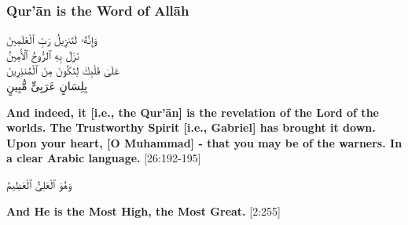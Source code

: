 \subsubsection*{Qur'\=an is the Word of All\=ah}
\begin{center}
    \begin{RLtext}
        وَإِنَّهُۥ لَتَنزِيلُ رَبِّ ٱلْعَٰلَمِينَ \\
        نَزَلَ بِهِ ٱلرُّوحُ ٱلْأَمِينُ \\
        عَلَىٰ قَلْبِكَ لِتَكُونَ مِنَ ٱلْمُنذِرِينَ \\
        بِلِسَانٍ عَرَبِىٍّ مُّبِينٍ 
    \end{RLtext}
\end{center}
\textbf{And indeed, it [i.e., the Qur’\=an] is the revelation of the Lord of the worlds. The Trustworthy Spirit [i.e., Gabriel] has brought it down. Upon your heart, [O Muhammad] - that you may be of the warners. In a clear Arabic language.} [26:192-195]

\begin{center}
    \begin{RLtext}
        وَهُوَ ٱلْعَلِىُّ ٱلْعَظِيمُ
    \end{RLtext}
    \textbf{And He is the Most High, the Most Great.} [2:255]
\end{center}